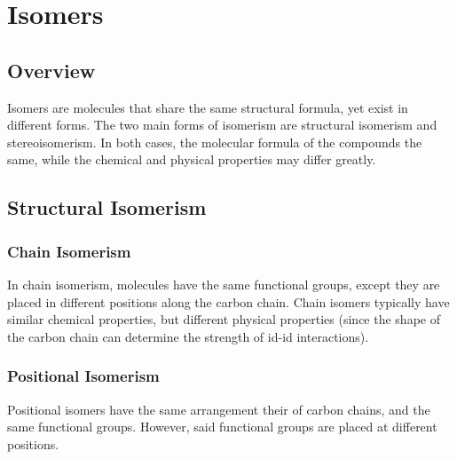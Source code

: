 


\pagebreak
\section{Isomers}
\subsection{Overview}

Isomers are molecules that share the same structural formula, yet exist in different forms. The two main
forms of isomerism are structural isomerism and stereoisomerism. In both cases, the molecular formula of the
compounds the same, while the chemical and physical properties may differ greatly.


\subsection{Structural Isomerism}

	\subsubsection{Chain Isomerism}

		In chain isomerism, molecules have the same functional groups, except they are placed in different positions
		along the carbon chain. Chain isomers typically have similar chemical properties, but different physical
		properties (since the shape of the carbon chain can determine the strength of id-id interactions).





	\subsubsection{Positional Isomerism}
		Positional isomers have the same arrangement their of carbon chains, and the same functional groups. However, said
		functional groups are placed at different positions.



